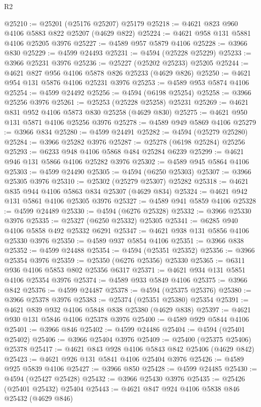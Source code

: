 \begin{lexlean}{R2}
\begin{coremodule}
@25210 := @25201 (@25176 @25207) @25179
@25218 := @4621 @823 @960 @4106 @5883 @822 @25207 (@4629 @822)
@25224 := @4621 @958 @131 @5881 @4106 @25205 @3976
@25227 := @4589 @957 @5879 @4106
@25228 := @3966 @830
@25229 := @4599 @24493
@25231 := @4594 (@25228 @25229)
@25233 := @3966 @25231 @3976
@25236 := @25227 (@25202 @25233) @25205
@25244 := @4621 @827 @956 @4106 @5878 @826 @25233 (@4629 @826)
@25250 := @4621 @954 @131 @5876 @4106 @25231 @3976
@25253 := @4589 @953 @5874 @4106
@25254 := @4599 @24492
@25256 := @4594 (@6198 @25254)
@25258 := @3966 @25256 @3976
@25261 := @25253 (@25228 @25258) @25231
@25269 := @4621 @831 @952 @4106 @5873 @830 @25258 (@4629 @830)
@25275 := @4621 @950 @131 @5871 @4106 @25256 @3976
@25278 := @4589 @949 @5869 @4106
@25279 := @3966 @834
@25280 := @4599 @24491
@25282 := @4594 (@25279 @25280)
@25284 := @3966 @25282 @3976
@25287 := @25278 (@6198 @25284) @25256
@25293 := @6233 @948 @4106 @5868 @484 @25284 @6239
@25299 := @4621 @946 @131 @5866 @4106 @25282 @3976
@25302 := @4589 @945 @5864 @4106
@25303 := @4599 @24490
@25305 := @4594 (@6250 @25303)
@25307 := @3966 @25305 @3976
@25310 := @25302 (@25279 @25307) @25282
@25318 := @4621 @835 @944 @4106 @5863 @834 @25307 (@4629 @834)
@25324 := @4621 @942 @131 @5861 @4106 @25305 @3976
@25327 := @4589 @941 @5859 @4106
@25328 := @4599 @24489
@25330 := @4594 (@6276 @25328)
@25332 := @3966 @25330 @3976
@25335 := @25327 (@6250 @25332) @25305
@25341 := @6285 @940 @4106 @5858 @492 @25332 @6291
@25347 := @4621 @938 @131 @5856 @4106 @25330 @3976
@25350 := @4589 @937 @5854 @4106
@25351 := @3966 @838
@25352 := @4599 @24488
@25354 := @4594 (@25351 @25352)
@25356 := @3966 @25354 @3976
@25359 := @25350 (@6276 @25356) @25330
@25365 := @6311 @936 @4106 @5853 @802 @25356 @6317
@25371 := @4621 @934 @131 @5851 @4106 @25354 @3976
@25374 := @4589 @933 @5849 @4106
@25375 := @3966 @842
@25376 := @4599 @24487
@25378 := @4594 (@25375 @25376)
@25380 := @3966 @25378 @3976
@25383 := @25374 (@25351 @25380) @25354
@25391 := @4621 @839 @932 @4106 @5848 @838 @25380 (@4629 @838)
@25397 := @4621 @930 @131 @5846 @4106 @25378 @3976
@25400 := @4589 @929 @5844 @4106
@25401 := @3966 @846
@25402 := @4599 @24486
@25404 := @4594 (@25401 @25402)
@25406 := @3966 @25404 @3976
@25409 := @25400 (@25375 @25406) @25378
@25417 := @4621 @843 @928 @4106 @5843 @842 @25406 (@4629 @842)
@25423 := @4621 @926 @131 @5841 @4106 @25404 @3976
@25426 := @4589 @925 @5839 @4106
@25427 := @3966 @850
@25428 := @4599 @24485
@25430 := @4594 (@25427 @25428)
@25432 := @3966 @25430 @3976
@25435 := @25426 (@25401 @25432) @25404
@25443 := @4621 @847 @924 @4106 @5838 @846 @25432 (@4629 @846)

\end{coremodule}
\end{lexlean}
